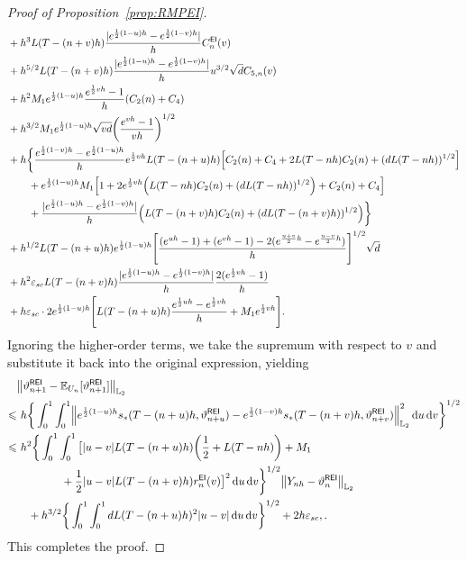 \begin{proof}[Proof of Proposition~\ref{prop:RMPEI}]
\begin{align*}
    &+h^3L(T-(n+v)h)\dfrac{|e^{\frac{1}{2}(1-u)h}-e^{\frac{1}{2}(1-v)h}|}{h}C_n^{\sf EI}(v)\\
    &+h^{5/2}L(T-(n+v)h)\dfrac{|e^{\frac{1}{2}(1-u)h}-e^{\frac{1}{2}(1-v)h}|}{h}u^{3/2}\sqrt{d}C_{5,n}(v)\\
    &+h^2M_1e^{\frac{1}{2}(1-u)h}\dfrac{e^{\frac{1}{2}vh}-1}{h}(C_2(n)+C_4)\\
    &+h^{3/2}M_1e^{\frac{1}{2}(1-u)h}\sqrt{vd}\left(\dfrac{e^{vh}-1}{vh}\right)^{1/2}\\
    &+h\bigg\{\dfrac{e^{\frac{1}{2}(1-v)h}-e^{\frac{1}{2}(1-u)h}}{h}e^{\frac{1}{2}vh}L(T-(n+u)h)\left[C_2(n)+C_4+2L(T-nh)C_2(n)+(dL(T-nh))^{1/2}\right]\\
    &\quad\quad +e^{\frac{1}{2}(1-u)h}M_1\left[1+2e^{\frac{1}{2}vh}\left(L(T-nh)C_2(n)+(dL(T-nh))^{1/2}\right)+C_2(n)+C_4\right]\\
    &\quad\quad +\dfrac{|e^{\frac{1}{2}(1-u)h}-e^{\frac{1}{2}(1-v)h}|}{h}\left(L(T-(n+v)h)C_2(n)+(dL(T-(n+v)h))^{1/2}\right)\bigg\}\\
    &+h^{1/2}L(T-(n+u)h)e^{\frac{1}{2}(1-u)h}\left[\dfrac{(e^{uh}-1)+(e^{vh}-1)-2(e^{\frac{u+v}{2}h}-e^{\frac{u-v}{2}h})}{h}\right]^{1/2}\sqrt{d}\\
    &+h^2\varepsilon_{sc}L(T-(n+v)h)\dfrac{|e^{\frac{1}{2}(1-u)h}-e^{\frac{1}{2}(1-v)h}|}{h}\dfrac{2(e^{\frac{1}{2}vh}-1)}{h}\\
    &+h\varepsilon_{sc}\cdot 2e^{\frac{1}{2}(1-u)h}\left[L(T-(n+u)h)\dfrac{e^{\frac{1}{2}uh}-e^{\frac{1}{2}vh}}{h}+M_1e^{\frac{1}{2}vh}\right].
\end{align*}
Ignoring the higher-order terms, we take the supremum with respect to $v$ and substitute it back into the original expression, yielding
\begin{align*}
    &\l|\vartheta_{n+1}^{\sf REI}-\mathbb{E}_{U_n}[\vartheta_{n+1}^{\sf REI}]\r|_{\Ltwo}\\
    \leqslant& \,\,h\bigg\{\int_0^1\int_0^1\left\lVert e^{\frac{1}{2}(1-u)h}s_*(T-(n+u)h,\vartheta_{n+u}^{\sf REI})-e^{\frac{1}{2}(1-v)h}s_*(T-(n+v)h,\vartheta_{n+v}^{\sf REI})\right\rVert_{\Ltwo}^2\rmd u\rmd v\bigg\}^{1/2}\\
    \leqslant& \,\,h^2\bigg\{\int_0^1\int_0^1\big[|u-v|L(T-(n+u)h)\left(\dfrac{1}{2}+L(T-nh)\right)+M_1\\
    &\qquad\qquad +\dfrac{1}{2}|u-v|L(T-(n+v)h)r_n^{\sf EI}(v)\big]^2\rmd u\rmd v\bigg\}^{1/2}\l|Y_{nh}-\vartheta_n^{\sf REI}\r|_{\Ltwo}\\
    &\quad +h^{3/2}\bigg\{\int_0^1\int_0^1dL(T-(n+u)h)^2|u-v|\rmd u\rmd v\bigg\}^{1/2} +2h\varepsilon_{sc},.
\end{align*}
This completes the proof.

\end{proof}
